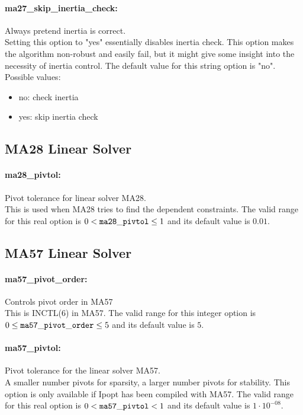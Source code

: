 \paragraph{ma27\_skip\_inertia\_check:}\label{sec:ma27_skip_inertia_check} Always pretend inertia is correct. $\;$ \\
 Setting this option to "yes" essentially disables
inertia check. This option makes the algorithm
non-robust and easily fail, but it might give
some insight into the necessity of inertia
control.
The default value for this string option is "no".
\\ 
Possible values:
\begin{itemize}
   \item no: check inertia
   \item yes: skip inertia check
\end{itemize}

\subsection{MA28 Linear Solver}
\label{sec:MA28_Linear_Solver}
\paragraph{ma28\_pivtol:}\label{sec:ma28_pivtol} Pivot tolerance for linear solver MA28. $\;$ \\
 This is used when MA28 tries to find the
dependent constraints. The valid range for this real option is 
$0 <  {\tt ma28\_pivtol } \le 1$
and its default value is $0.01$.


\subsection{MA57 Linear Solver}
\label{sec:MA57_Linear_Solver}
\paragraph{ma57\_pivot\_order:}\label{sec:ma57_pivot_order} Controls pivot order in MA57 $\;$ \\
 This is INCTL(6) in MA57. The valid range for this integer option is
$0 \le {\tt ma57\_pivot\_order } \le 5$
and its default value is $5$.


\paragraph{ma57\_pivtol:}\label{sec:ma57_pivtol} Pivot tolerance for the linear solver MA57. $\;$ \\
 A smaller number pivots for sparsity, a larger
number pivots for stability. This option is only
available if Ipopt has been compiled with MA57. The valid range for this real option is 
$0 <  {\tt ma57\_pivtol } <  1$
and its default value is $1 \cdot 10^{-08}$.


